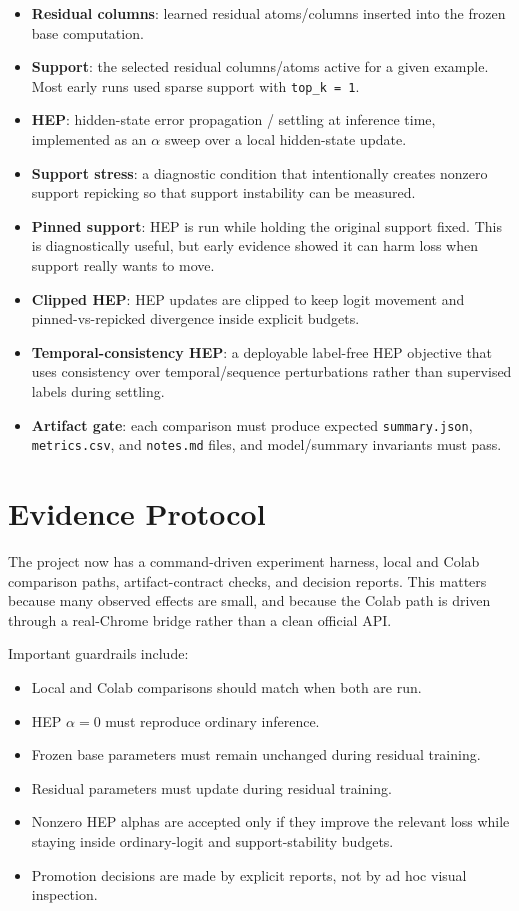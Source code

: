 \documentclass[11pt]{article}
\begin{document}
\begin{itemize}
  \item \textbf{Residual columns}: learned residual atoms/columns inserted into
  the frozen base computation.
  \item \textbf{Support}: the selected residual columns/atoms active for a
  given example. Most early runs used sparse support with \texttt{top\_k = 1}.
  \item \textbf{HEP}: hidden-state error propagation / settling at inference
  time, implemented as an $\alpha$ sweep over a local hidden-state update.
  \item \textbf{Support stress}: a diagnostic condition that intentionally
  creates nonzero support repicking so that support instability can be measured.
  \item \textbf{Pinned support}: HEP is run while holding the original support
  fixed. This is diagnostically useful, but early evidence showed it can harm
  loss when support really wants to move.
  \item \textbf{Clipped HEP}: HEP updates are clipped to keep logit movement and
  pinned-vs-repicked divergence inside explicit budgets.
  \item \textbf{Temporal-consistency HEP}: a deployable label-free HEP
  objective that uses consistency over temporal/sequence perturbations rather
  than supervised labels during settling.
  \item \textbf{Artifact gate}: each comparison must produce expected
  \texttt{summary.json}, \texttt{metrics.csv}, and \texttt{notes.md} files, and
  model/summary invariants must pass.
\end{itemize}

\section{Evidence Protocol}

The project now has a command-driven experiment harness, local and Colab
comparison paths, artifact-contract checks, and decision reports. This matters
because many observed effects are small, and because the Colab path is driven
through a real-Chrome bridge rather than a clean official API.

Important guardrails include:

\begin{itemize}
  \item Local and Colab comparisons should match when both are run.
  \item HEP $\alpha = 0$ must reproduce ordinary inference.
  \item Frozen base parameters must remain unchanged during residual training.
  \item Residual parameters must update during residual training.
  \item Nonzero HEP alphas are accepted only if they improve the relevant loss
  while staying inside ordinary-logit and support-stability budgets.
  \item Promotion decisions are made by explicit reports, not by ad hoc visual
  inspection.
\end{itemize}
\end{document}
